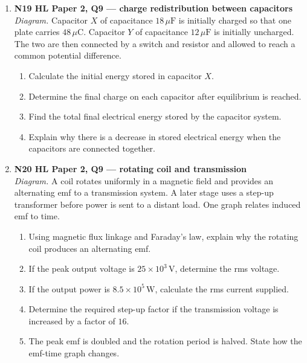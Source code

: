 \documentclass[11pt]{article}
\begin{document}
\begin{enumerate}[leftmargin=*, itemsep=1.1em]
\item \textbf{N19 HL Paper 2, Q9 --- charge redistribution between capacitors}\\
\textit{Diagram.} Capacitor $X$ of capacitance $18\,\mu\text{F}$ is initially charged so that one plate carries $48\,\mu\text{C}$. Capacitor $Y$ of capacitance $12\,\mu\text{F}$ is initially uncharged. The two are then connected by a switch and resistor and allowed to reach a common potential difference.
\begin{enumerate}[label=(\alph*)]
\item Calculate the initial energy stored in capacitor $X$.
\item Determine the final charge on each capacitor after equilibrium is reached.
\item Find the total final electrical energy stored by the capacitor system.
\item Explain why there is a decrease in stored electrical energy when the capacitors are connected together.
\end{enumerate}

\item \textbf{N20 HL Paper 2, Q9 --- rotating coil and transmission}\\
\textit{Diagram.} A coil rotates uniformly in a magnetic field and provides an alternating emf to a transmission system. A later stage uses a step-up transformer before power is sent to a distant load. One graph relates induced emf to time.
\begin{enumerate}[label=(\alph*)]
\item Using magnetic flux linkage and Faraday's law, explain why the rotating coil produces an alternating emf.
\item If the peak output voltage is $25\times10^{3}\,\text{V}$, determine the rms voltage.
\item If the output power is $8.5\times10^{5}\,\text{W}$, calculate the rms current supplied.
\item Determine the required step-up factor if the transmission voltage is increased by a factor of $16$.
\item The peak emf is doubled and the rotation period is halved. State how the emf-time graph changes.
\end{enumerate}

\end{enumerate}
\end{document}
